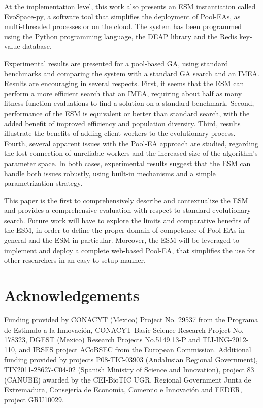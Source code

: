At the implementation level, this work also presents an ESM instantiation called EvoSpace-py, a software tool that simplifies the deployment of Pool-EAs,
as multi-threaded processes or on the cloud.
The system has been programmed using the Python programming language, the DEAP library and the Redis key-value database.

Experimental results are presented for a pool-based GA, using standard benchmarks and comparing the system with a standard GA search and an IMEA.
Results are encouraging in several respects.
First, it seems that the ESM can perform a more efficient search that an IMEA, requiring about half as many fitness function evaluations to find
a solution on a standard benchmark.
Second, performance of the ESM is equivalent or better than standard search, with the added benefit of improved efficiency
and population diversity.
Third, results illustrate the benefits of adding client workers to the evolutionary process.
Fourth, several apparent issues with the Pool-EA approach are studied, regarding the lost connection of unreliable workers and the increased size of the algorithm's parameter space.
In both cases, experimental results suggest that the ESM can handle both issues robustly, using built-in mechanisms and a simple
parametrization strategy.

This paper is the first to comprehensively describe and contextualize the ESM and provides a comprehensive evaluation with respect to standard evolutionary search.
Future work will have to explore the limits and comparative benefits of the ESM,
in order to define the proper domain of competence of Pool-EAs in general and the ESM in particular.
Moreover, the ESM will be leveraged to implement and deploy a complete web-based Pool-EA, that simplifies the use for other researchers in an easy to setup manner.


\section*{Acknowledgements}
Funding provided by CONACYT (Mexico) Project No. 29537 from the Programa de Estimulo a la Innovaci\'on, CONACYT
Basic Science Research Project No. 178323, DGEST (Mexico) Research Projects No.5149.13-P and TIJ-ING-2012-110,
and IRSES project ACoBSEC from the European Commission.
Additional funding provided by projects P08-TIC-03903 (Andalusian Regional Government), TIN2011-28627-C04-02 (Spanish Ministry of Science and Innovation),
project 83 (CANUBE) awarded by the CEI-BioTIC UGR. Regional Government Junta de Extremadura, Consejer\'ia de Econom\'ia, Comercio e Innovaci\'on and FEDER, project GRU10029.


